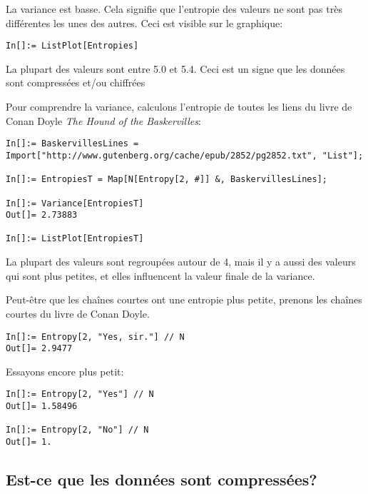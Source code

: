 La variance est basse.
Cela signifie que l'entropie des valeurs ne sont pas très différentes les unes des autres.
Ceci est visible sur le graphique:

\begin{lstlisting}
In[]:= ListPlot[Entropies]
\end{lstlisting}

\begin{figure}[H]
\centering
{}
\end{figure}

La plupart des valeurs sont entre 5.0 et 5.4.
Ceci est un signe que les données sont compressées et/ou chiffrées

Pour comprendre la variance, calculons l'entropie de toutes les liens du livre de
Conan Doyle \emph{The Hound of the Baskervilles}:

\begin{lstlisting}
In[]:= BaskervillesLines = Import["http://www.gutenberg.org/cache/epub/2852/pg2852.txt", "List"];

In[]:= EntropiesT = Map[N[Entropy[2, #]] &, BaskervillesLines];

In[]:= Variance[EntropiesT]
Out[]= 2.73883

In[]:= ListPlot[EntropiesT]
\end{lstlisting}

\begin{figure}[H]
\centering
{}
\end{figure}

La plupart des valeurs sont regroupées autour de 4, mais il y a aussi des valeurs
qui sont plus petites, et elles influencent la valeur finale de la variance.

Peut-être que les chaînes courtes ont une entropie plus petite, prenons les chaînes
courtes du livre de Conan Doyle.

\begin{lstlisting}
In[]:= Entropy[2, "Yes, sir."] // N
Out[]= 2.9477
\end{lstlisting}

Essayons encore plus petit:

\begin{lstlisting}
In[]:= Entropy[2, "Yes"] // N
Out[]= 1.58496

In[]:= Entropy[2, "No"] // N
Out[]= 1.
\end{lstlisting}

\subsection{Est-ce que les données sont compressées?}

